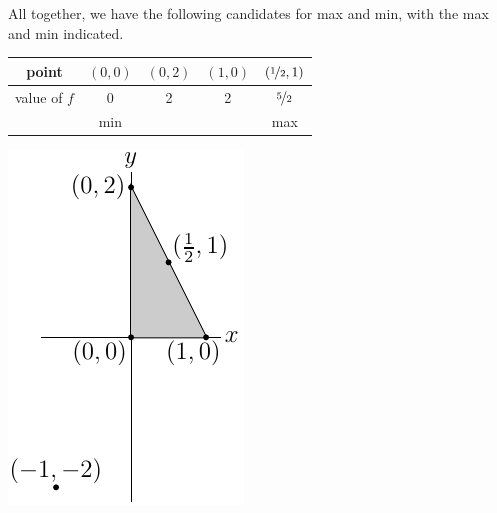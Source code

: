 \begin{eg}
\begin{itemize}
\end{itemize}
All together, we have the following candidates for max and min, with the
max and min indicated.
\begin{center}
\renewcommand{\arraystretch}{1.3}
     \begin{tabular}{|c|c|c|c|c|}
     \hline
       point
       &$(0,0)$
       &$(0,2)$
       &$(1,0)$
       &$(\nicefrac{1}{2},1)$
       \\   \hline
       value of $f$
       &0
       &2
       &2 
       & $\nicefrac{5}{2}$\\ \hline
       &min
       & 
       & 
       &max\\ \hline
     \end{tabular}
\renewcommand{\arraystretch}{1.0}
\end{center}

\begin{efig}
\begin{center}
   \includegraphics{optExampleCCb}
\end{center}
\end{efig}
\end{eg}
\goodbreak


